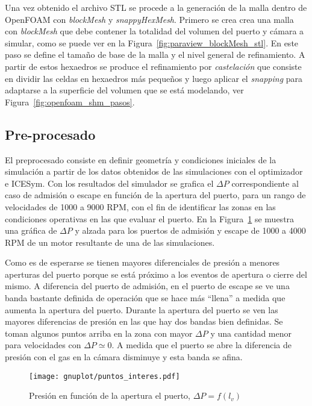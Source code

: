 Una vez obtenido el archivo STL se procede a la generación de la malla dentro de
OpenFOAM con \emph{blockMesh} y \emph{snappyHexMesh}.
%
Primero se crea crea una malla con \emph{blockMesh} que  debe contener la
totalidad del volumen del puerto y cámara a simular, como se puede ver en la
Figura~\ref{fig:paraview_blockMesh_stl}.
%
En este paso se define el tamaño de base de la malla y el nivel general de
refinamiento.
%
A partir de estos hexaedros se produce el refinamiento por \emph{castelación}
que consiste en dividir las celdas en hexaedros más pequeños y luego aplicar el
\emph{snapping} para adaptarse a la superficie del volumen que se está
modelando, ver Figura~\ref{fig:openfoam_shm_pasos}.
%

\subsection{Pre-procesado}

%
El preprocesado consiste en definir geometría y condiciones iniciales de la
simulación a partir de los datos obtenidos de las simulaciones con el
optimizador e ICESym.
%
Con los resultados del simulador se grafica el $\Delta P$ correspondiente al
caso de admisión o escape en función de la apertura del puerto, para un rango de
velocidades de 1000 a 9000 RPM, con el fin de identificar las zonas en las
condiciones operativas en las que evaluar el puerto.
%
En la Figura~\ref{fig:puntos_interes} se muestra una gráfica de $\Delta P$ y
alzada para los puertos de admisión y escape de 1000 a 4000 RPM de un motor
resultante de una de las simulaciones.

Como es de esperarse se tienen mayores diferenciales de presión a menores
aperturas del puerto porque se está próximo a los eventos de apertura o cierre
del mismo.
%
A diferencia del puerto de admisión, en el puerto de escape se ve una banda
bastante definida de operación que se hace más ``llena'' a medida que aumenta la
apertura del puerto.
%
Durante la apertura del puerto se ven las mayores diferencias de presión en las
que hay dos bandas bien definidas.
%
Se toman algunos puntos arriba en la zona con mayor $\Delta P$ y una cantidad
menor para velocidades con $\Delta P \simeq 0$.
%
A medida que el puerto se abre la diferencia de presión con el gas en la cámara
disminuye y esta banda se afina.

\begin{figure}[h!]  \centering
\texttt{[image: gnuplot/puntos\_interes.pdf]}
    \caption{Presión en función de la apertura el puerto,
$\Delta P = f(l_{v})$}\label{fig:puntos_interes}
\end{figure}

